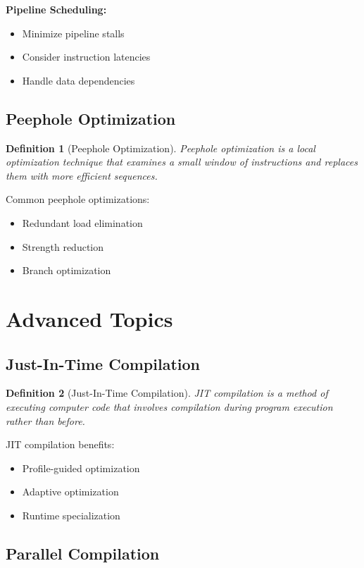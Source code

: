 \documentclass[11pt]{article}
\newtheorem{definition}{Definition}[section]
\begin{document}
\textbf{Pipeline Scheduling:}
\begin{itemize}
    \item Minimize pipeline stalls
    \item Consider instruction latencies
    \item Handle data dependencies
\end{itemize}

\subsection{Peephole Optimization}

\begin{definition}[Peephole Optimization]
Peephole optimization is a local optimization technique that examines a small window of instructions and replaces them with more efficient sequences.
\end{definition}

Common peephole optimizations:
\begin{itemize}
    \item Redundant load elimination
    \item Strength reduction
    \item Branch optimization
\end{itemize}

\section{Advanced Topics}

\subsection{Just-In-Time Compilation}

\begin{definition}[Just-In-Time Compilation]
JIT compilation is a method of executing computer code that involves compilation during program execution rather than before.
\end{definition}

JIT compilation benefits:
\begin{itemize}
    \item Profile-guided optimization
    \item Adaptive optimization
    \item Runtime specialization
\end{itemize}

\subsection{Parallel Compilation}
\end{document}
